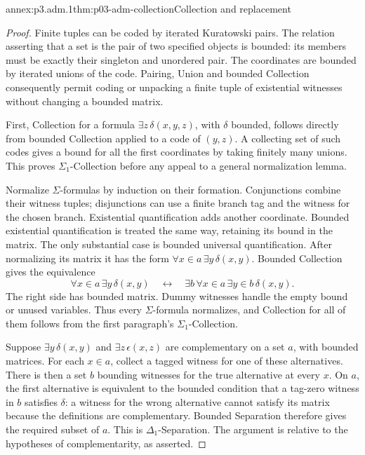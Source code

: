 \begin{annexitem}{annex:p3.adm.1}{thm:p03-adm-collection}{Collection and replacement}
\begin{proof}
Finite tuples can be coded by iterated Kuratowski pairs. The relation
asserting that a set is the pair of two specified objects is bounded:
its members must be exactly their singleton and unordered pair. The
coordinates are bounded by iterated unions of the code. Pairing, Union
and bounded Collection consequently permit coding or unpacking a finite
tuple of existential witnesses without changing a bounded matrix.

First, Collection for a formula \(\exists z\,\delta(x,y,z)\), with
\(\delta\) bounded, follows directly from bounded Collection applied to
a code of \((y,z)\). A collecting set of such codes gives a bound for
all the first coordinates by taking finitely many unions. This proves
\(\Sigma_1\)-Collection before any appeal to a general normalization
lemma.

Normalize \(\Sigma\)-formulas by induction on their formation.
Conjunctions combine their witness tuples; disjunctions can use a finite
branch tag and the witness for the chosen branch. Existential
quantification adds another coordinate. Bounded existential
quantification is treated the same way, retaining its bound in the
matrix. The only substantial case is bounded universal quantification.
After normalizing its matrix it has the form
\(\forall x\in a\,\exists y\,\delta(x,y)\). Bounded Collection gives the
equivalence
\[
 \forall x\in a\,\exists y\,\delta(x,y)
 \quad\longleftrightarrow\quad
 \exists b\,\forall x\in a\,\exists y\in b\,\delta(x,y).
\]
The right side has bounded matrix. Dummy witnesses handle the empty
bound or unused variables. Thus every \(\Sigma\)-formula normalizes,
and Collection for all of them follows from the first paragraph's
\(\Sigma_1\)-Collection.

Suppose \(\exists y\,\delta(x,y)\) and \(\exists z\,\epsilon(x,z)\)
are complementary on a set \(a\), with bounded matrices. For each
\(x\in a\), collect a tagged witness for one of these alternatives.
There is then a set \(b\) bounding witnesses for the true alternative
at every \(x\). On \(a\), the first alternative is equivalent to the
bounded condition that a tag-zero witness in \(b\) satisfies
\(\delta\): a witness for the wrong alternative cannot satisfy its
matrix because the definitions are complementary. Bounded Separation
therefore gives the required subset of \(a\). This is
\(\Delta_1\)-Separation. The argument is relative to the hypotheses of
complementarity, as asserted.


\end{proof}
\end{annexitem}
